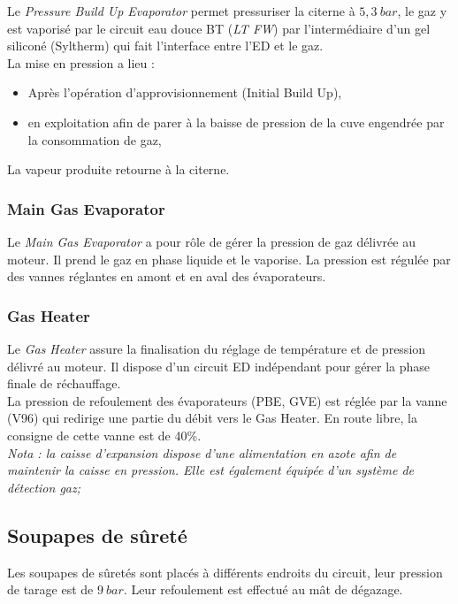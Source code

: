 \documentclass[12pt,a4paper]{article}
\begin{document}
Le \emph{Pressure Build Up Evaporator} permet pressuriser la citerne à $5,3~bar$, le gaz y est vaporisé par le circuit eau douce BT (\emph{LT FW}) par l'intermédiaire d'un gel siliconé (Syltherm) qui fait l'interface entre l'ED et le gaz.\\
La mise en pression a lieu :
\begin{itemize}
    \item Après l'opération d'approvisionnement (Initial Build Up),
    \item en exploitation afin de parer à la baisse de pression de la cuve engendrée par la consommation de gaz,
\end{itemize}
La vapeur produite retourne à la citerne.



\subsubsection{Main Gas Evaporator}


Le \emph{Main Gas Evaporator} a pour rôle de gérer la pression de gaz délivrée au moteur. Il prend le gaz en phase liquide et le vaporise. La pression est régulée par des vannes réglantes en amont et en aval des évaporateurs.

\subsubsection{Gas Heater}

Le \emph{Gas Heater} assure la finalisation du réglage de température et de pression délivré au moteur. Il dispose d'un circuit ED indépendant pour gérer la phase finale de réchauffage.\\
La pression de refoulement des évaporateurs (PBE, GVE) est réglée par la vanne (V96) qui redirige une partie du débit vers le Gas Heater. En route libre, la consigne de cette vanne est de 40\%.\\


\emph{Nota : la caisse d'expansion dispose d'une alimentation en azote afin de maintenir la caisse en pression. Elle est également équipée d'un système de détection gaz;}

\subsection{Soupapes de sûreté}

Les soupapes de sûretés sont placés à différents endroits du circuit, leur pression de tarage est de $9~bar$. Leur refoulement est effectué au mât de dégazage.
\end{document}

